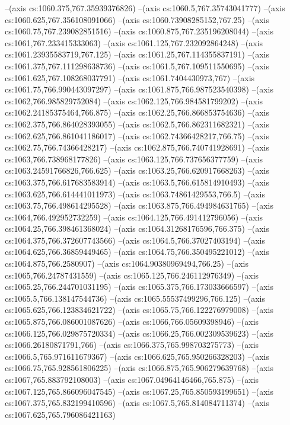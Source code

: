 --(axis cs:1060.375,767.35939376826)
--(axis cs:1060.5,767.35743041777)
--(axis cs:1060.625,767.356108091066)
--(axis cs:1060.73908285152,767.25)
--(axis cs:1060.75,767.239082851516)
--(axis cs:1060.875,767.235196208044)
--(axis cs:1061,767.233415333063)
--(axis cs:1061.125,767.232092864248)
--(axis cs:1061.23935583719,767.125)
--(axis cs:1061.25,767.114355837191)
--(axis cs:1061.375,767.111298638736)
--(axis cs:1061.5,767.109511550695)
--(axis cs:1061.625,767.108268037791)
--(axis cs:1061.7404430973,767)
--(axis cs:1061.75,766.990443097297)
--(axis cs:1061.875,766.987523540398)
--(axis cs:1062,766.985829752084)
--(axis cs:1062.125,766.984581799202)
--(axis cs:1062.24185375464,766.875)
--(axis cs:1062.25,766.866853754636)
--(axis cs:1062.375,766.864028393055)
--(axis cs:1062.5,766.862311682321)
--(axis cs:1062.625,766.861041186017)
--(axis cs:1062.74366428217,766.75)
--(axis cs:1062.75,766.74366428217)
--(axis cs:1062.875,766.740741928691)
--(axis cs:1063,766.738968177826)
--(axis cs:1063.125,766.737656377759)
--(axis cs:1063.24591766826,766.625)
--(axis cs:1063.25,766.620917668263)
--(axis cs:1063.375,766.617683583914)
--(axis cs:1063.5,766.615814910493)
--(axis cs:1063.625,766.614441011973)
--(axis cs:1063.74861429553,766.5)
--(axis cs:1063.75,766.498614295528)
--(axis cs:1063.875,766.494984631765)
--(axis cs:1064,766.492952732259)
--(axis cs:1064.125,766.491412796056)
--(axis cs:1064.25,766.398461368024)
--(axis cs:1064.31268176596,766.375)
--(axis cs:1064.375,766.372607743566)
--(axis cs:1064.5,766.37027403194)
--(axis cs:1064.625,766.36859449465)
--(axis cs:1064.75,766.350495221012)
--(axis cs:1064.875,766.2580907)
--(axis cs:1064.90380969494,766.25)
--(axis cs:1065,766.24787431559)
--(axis cs:1065.125,766.246112976349)
--(axis cs:1065.25,766.244701031195)
--(axis cs:1065.375,766.173033666597)
--(axis cs:1065.5,766.138147544736)
--(axis cs:1065.55537499296,766.125)
--(axis cs:1065.625,766.123834621722)
--(axis cs:1065.75,766.122276979008)
--(axis cs:1065.875,766.086001087626)
--(axis cs:1066,766.05609398946)
--(axis cs:1066.125,766.029875720334)
--(axis cs:1066.25,766.002309539623)
--(axis cs:1066.26180871791,766)
--(axis cs:1066.375,765.998703275773)
--(axis cs:1066.5,765.971611679367)
--(axis cs:1066.625,765.950266328203)
--(axis cs:1066.75,765.928561806225)
--(axis cs:1066.875,765.906279639768)
--(axis cs:1067,765.883792108003)
--(axis cs:1067.04964146466,765.875)
--(axis cs:1067.125,765.866096047545)
--(axis cs:1067.25,765.850593199651)
--(axis cs:1067.375,765.832199410596)
--(axis cs:1067.5,765.814084711374)
--(axis cs:1067.625,765.796086421163)
